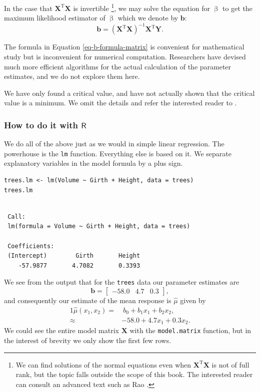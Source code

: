 \documentclass[captions=tableheading]{scrbook}
\begin{document}
In the case that \(\mathbf{X}^{\mathrm{T}}\mathbf{X}\) is invertible
\footnote{We can find solutions of the normal equations even when \(\mathbf{X}^{\mathrm{T}}\mathbf{X}\) is not of full rank, but the topic falls outside the scope of this book. The interested reader can consult an advanced text such as Rao \cite{Rao1999}.},
we may solve the equation for \(\upbeta\) to get the maximum likelihood estimator of \(\upbeta\) which we denote by \(\mathbf{b}\):
\begin{equation}
\mathbf{b}=\left(\mathbf{X}^{\mathrm{T}}\mathbf{X}\right)^{-1}\mathbf{X}^{\mathrm{T}}\mathbf{Y}.\label{eq-b-formula-matrix}
\end{equation}

\begin{rem}
The formula in Equation \ref{eq-b-formula-matrix} is convenient for mathematical study but is inconvenient for numerical computation. Researchers have devised much more efficient algorithms for the actual calculation of the parameter estimates, and we do not explore them here.
\end{rem}

\begin{rem}
We have only found a critical value, and have not actually shown that the critical value is a minimum. We omit the details and refer the interested reader to \cite{Rao1999}.
\end{rem}
\subsubsection{How to do it with \(\mathsf{R}\)}
\label{sec-12-2-1-1}


We do all of the above just as we would in simple linear regression. The powerhouse is the \texttt{lm} function. Everything else is based on it. We separate explanatory variables in the model formula by a plus sign.


\begin{verbatim}
trees.lm <- lm(Volume ~ Girth + Height, data = trees)
trees.lm
\end{verbatim}

\begin{verbatim}
 
 Call:
 lm(formula = Volume ~ Girth + Height, data = trees)
 
 Coefficients:
 (Intercept)        Girth       Height  
    -57.9877       4.7082       0.3393
\end{verbatim}

We see from the output that for the \texttt{trees} data our parameter estimates are 
\[
\mathbf{b}=\begin{bmatrix}-58.0 & 4.7 & 0.3\end{bmatrix},
\] 
and consequently our estimate of the mean response is \(\hat{\mu}\) given by 
\begin{alignat}{1}
\hat{\mu}(x_{1},x_{2})= & \ b_{0}+b_{1}x_{1}+b_{2}x_{2},\\
\approx & -58.0+4.7x_{1}+0.3x_{2}.
\end{alignat}
We could see the entire model matrix \(\mathbf{X}\) with the \texttt{model.matrix} function, but in the interest of brevity we only show the first few rows. 
\end{document}
